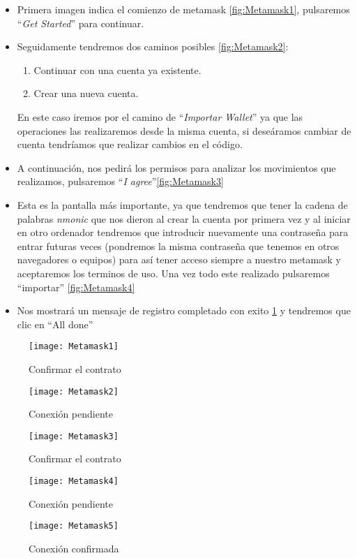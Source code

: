 \begin{itemize}
	\begin{itemize}
		\item Primera imagen indica el comienzo de metamask \ref{fig:Metamask1}, pulsaremos ``\textit{Get Started}'' para continuar.
		\item Seguidamente tendremos dos caminos posibles \ref{fig:Metamask2}:
			\begin{enumerate}
				\item Continuar con una cuenta ya existente.
				\item Crear una nueva cuenta.
			\end{enumerate}
		En este caso iremos por el camino de ``\textit{Importar Wallet}'' ya que las operaciones las realizaremos desde la misma cuenta, si deseáramos cambiar de cuenta tendríamos que realizar cambios en el código.	
		\item A continuación, nos pedirá los permisos para analizar los movimientos que realizamos, pulsaremos ``\textit{I agree}''\ref{fig:Metamask3}
		\item Esta es la pantalla más importante, ya que tendremos que tener la cadena de palabras \textit{nmonic} que nos dieron al crear la cuenta por primera vez y al iniciar en otro ordenador tendremos que introducir nuevamente una contraseña para entrar futuras veces (pondremos la misma contraseña que tenemos en otros navegadores o equipos) para así tener acceso siempre a nuestro metamask y aceptaremos los terminos de uso. Una vez todo este realizado pulsaremos ``importar'' \ref{fig:Metamask4}
		\item Nos mostrará un mensaje de registro completado con exito \ref{fig:Metamask5} y tendremos que clic en ``All done''
	\end{itemize}
\begin{figure}[H]
	\begin{minipage}[b]{0.5\linewidth}
		\centering
		\texttt{[image: Metamask1]}
		\caption{Confirmar el contrato}
		\label{fig:Metamask1}
	\end{minipage}
\hspace{0.5cm}
	\begin{minipage}[b]{0.5\linewidth}
		\centering
		\texttt{[image: Metamask2]}
		\caption{Conexión pendiente}
		\label{fig:Metamask2}
	\end{minipage}
	\begin{minipage}[b]{0.5\linewidth}
		\centering
		\texttt{[image: Metamask3]}
		\caption{Confirmar el contrato}
		\label{fig:Metamask3}
	\end{minipage}
\hspace{0.5cm}
	\begin{minipage}[b]{0.5\linewidth}
		\centering
		\texttt{[image: Metamask4]}
		\caption{Conexión pendiente}
		\label{fig:Metamask4}
	\end{minipage}
	\begin{minipage}[b]{0.8\linewidth}
		\centering
		\texttt{[image: Metamask5]}
		\caption{Conexión confirmada}
		\label{fig:Metamask5}
	\end{minipage}
\end{figure}


\end{itemize}
